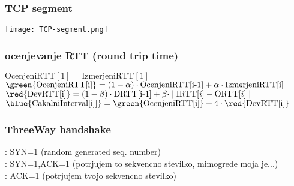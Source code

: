 \subsubsection{TCP segment}
\texttt{[image: TCP-segment.png]}


\subsubsection{ocenjevanje RTT (round trip time)}
$\text{OcenjeniRTT}[1] = \text{IzmerjeniRTT}[1]$\\
$\green{\text{OcenjeniRTT[i]}} = (1-\alpha) \cdot \text{OcenjeniRTT[i-1]} + \alpha \cdot \text{IzmerjeniRTT[i]}$\\
$\red{\text{DevRTT[i]}}=(1-\beta)\cdot \text{DRTT[i-1]} + \beta \cdot \mid \text{IRTT}[i]-\text{ORTT}[i]\mid$\\
$\blue{\text{CakalniInterval[i]]}}=\green{\text{OcenjeniRTT[i]}}+ 4\cdot \red{\text{DevRTT[i]}}$



\subsubsection{ThreeWay handshake}
: SYN=1 (random generated seq. number)\\
: SYN=1,ACK=1 (potrjujem to sekvencno stevilko, mimogrede moja je...)\\
: ACK=1 (potrjujem tvojo sekvencno stevilko)

